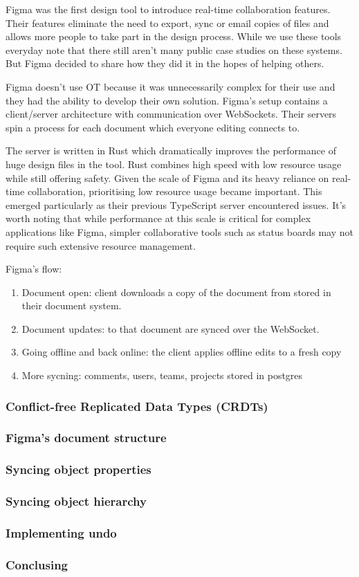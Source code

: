 Figma was the first design tool to introduce real-time collaboration features. Their features eliminate the need to export, sync or email copies of files and allows more people to take part in the design process. While we use these tools everyday note that there still aren't many public case studies on these systems. But Figma decided to share how they did it in the hopes of helping others.

Figma doesn't use OT because it was unnecessarily complex for their use and they had the ability to develop their own solution. Figma's setup contains a client/server architecture with communication over WebSockets. Their servers spin a process for each document which everyone editing connects to. \cite{figma-rtc}

The server is written in Rust which dramatically improves the performance of huge design files in the tool. Rust combines high speed with low resource usage while still offering safety. Given the scale of Figma and its heavy reliance on real-time collaboration, prioritising low resource usage became important. This emerged particularly as their previous TypeScript server encountered issues. It's worth noting that while performance at this scale is critical for complex applications like Figma, simpler collaborative tools such as status boards may not require such extensive resource management. \cite{figma-rust}

Figma's flow:

\begin{enumerate}
  \item Document open: client downloads a copy of the document from stored in their document system.
  \item Document updates: to that document are synced over the WebSocket.
  \item Going offline and back online: the client applies offline edits to a fresh copy
  \item More sycning: comments, users, teams, projects stored in postgres
\end{enumerate}

\subsubsection*{Conflict-free Replicated Data Types (CRDTs)}

\subsubsection*{Figma's document structure}

\subsubsection*{Syncing object properties}

\subsubsection*{Syncing object hierarchy}

\subsubsection*{Implementing undo}

\subsubsection*{Conclusing}
